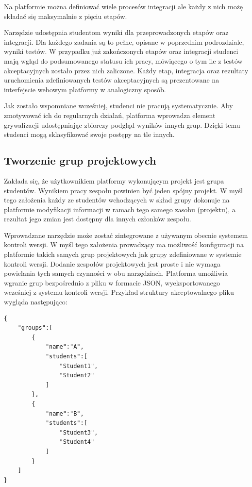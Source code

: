 Na platformie można definiować wiele procesów integracji ale każdy z nich możę składać się maksymalnie z pięciu etapów.

Narzędzie udostępnia studentom wyniki dla przeprowadzonych etapów oraz integracji.
Dla każdego zadania są to pełne, opisane w poprzednim podrozdziale, wyniki testów.
W przypadku już zakończonych etapów oraz integracji studenci mają wgląd do podsumowanego statusu ich pracy, mówiącego o tym ile z testów akceptacyjnych zostało przez nich zaliczone.
Każdy etap, integracja oraz rezultaty uruchomienia zdefiniowanych testów akceptacyjnych są prezentowane na interfejscie webowym platformy w analogiczny sposób.

Jak zostało wspomniane wcześniej, studenci nie pracują systematycznie.
Aby zmotywować ich do regularnych działań, platforma wprowadza element grywalizacji udostępniając zbiorczy podgląd wyników innych grup.
Dzięki temu studenci mogą sklasyfikować swoje postępy na tle innych.


\subsection{Tworzenie grup projektowych}
\label{adding_project_groups}

Zakłada się, że użytkownikiem platformy wykonującym projekt jest grupa studentów.
Wynikiem pracy zespołu powinien być jeden spójny projekt.
W myśl tego założenia każdy ze studentów wchodzących w skład grupy dokonuje na platformie modyfikacji informacji w ramach tego samego zasobu (projektu), a rezultat jego zmian jest dostępny dla innych członków zespołu.

Wprowadzane narzędzie może zostać zintegrowane z używanym obecnie systemem kontroli wersji.
W myśl tego założenia prowadzący ma możliwość konfiguracji na platformie takich samych grup projektowych jak grupy zdefiniowane w systemie kontroli wersji.
Dodanie zespołów projektowych jest proste i nie wymaga powielania tych samych czynności w obu narzędziach.
Platforma umożliwia wgranie grup bezpośrednio z pliku w formacie JSON, wyeksportowanego wcześniej z systemu kontroli wersji.
Przykład struktury akceptowalnego pliku wygląda następująco:

{\selectfont
\scriptsize
\begin{lstlisting}
{
    "groups":[
        {
            "name":"A",
            "students":[
                "Student1",
                "Student2"
            ]
        },
        {
            "name":"B",
            "students":[
                "Student3",
                "Student4"
            ]
        }
    ]
}
\end{lstlisting}
}

